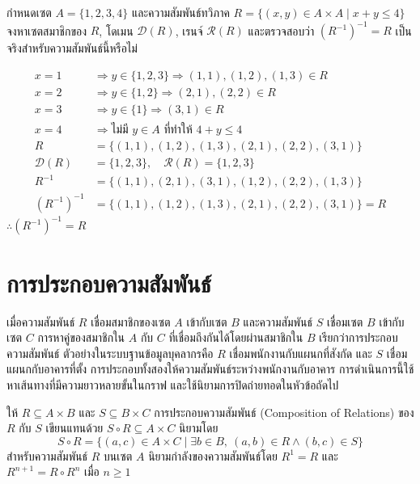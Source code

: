 \begin{ex}
\label{ex:domain-range-inequality}
กำหนดเซต $A = \{1, 2, 3, 4\}$ และความสัมพันธ์ทวิภาค $R = \{(x,y) \in A \times A \mid x + y \le 4\}$ จงหาเซตสมาชิกของ $R$, โดเมน $\mathcal{D}(R)$, เรนจ์ $\mathcal{R}(R)$ และตรวจสอบว่า $(R^{-1})^{-1} = R$ เป็นจริงสำหรับความสัมพันธ์นี้หรือไม่
\end{ex}
\begin{solution}
\begin{align*}
x = 1 &\Rightarrow y \in \{1,2,3\} \Rightarrow (1,1),(1,2),(1,3) \in R\\
x = 2 &\Rightarrow y \in \{1,2\} \Rightarrow (2,1),(2,2) \in R\\
x = 3 &\Rightarrow y \in \{1\} \Rightarrow (3,1) \in R\\
x = 4 &\Rightarrow \text{ไม่มี } y \in A \text{ ที่ทำให้ } 4+y \le 4\\
R &= \{(1,1),(1,2),(1,3),(2,1),(2,2),(3,1)\}\\
\mathcal{D}(R) &= \{1,2,3\}, \quad \mathcal{R}(R) = \{1,2,3\}\\
R^{-1} &= \{(1,1),(2,1),(3,1),(1,2),(2,2),(1,3)\}\\
(R^{-1})^{-1} &= \{(1,1),(1,2),(1,3),(2,1),(2,2),(3,1)\} = R
\end{align*}
$\therefore (R^{-1})^{-1} = R$ \solhere
\end{solution}



\section{การประกอบความสัมพันธ์}
\label{sec:relation-composition}
เมื่อความสัมพันธ์ $R$ เชื่อมสมาชิกของเซต $A$ เข้ากับเซต $B$ และความสัมพันธ์ $S$ เชื่อมเซต $B$ เข้ากับเซต $C$ การหาคู่ของสมาชิกใน $A$ กับ $C$ ที่เชื่อมถึงกันได้โดยผ่านสมาชิกใน $B$ เรียกว่าการประกอบความสัมพันธ์ ตัวอย่างในระบบฐานข้อมูลบุคลากรคือ $R$ เชื่อมพนักงานกับแผนกที่สังกัด และ $S$ เชื่อมแผนกกับอาคารที่ตั้ง การประกอบทั้งสองให้ความสัมพันธ์ระหว่างพนักงานกับอาคาร การดำเนินการนี้ใช้หาเส้นทางที่มีความยาวหลายขั้นในกราฟ และใช้นิยามการปิดถ่ายทอดในหัวข้อถัดไป~\parencite{johnsonbaugh2016discrete}

\begin{definition}[การประกอบความสัมพันธ์]
ให้ $R \subseteq A \times B$ และ $S \subseteq B \times C$ การประกอบความสัมพันธ์ (Composition of Relations) ของ $R$ กับ $S$ เขียนแทนด้วย $S \circ R \subseteq A \times C$ นิยามโดย
\[ S \circ R = \{(a,c) \in A \times C \mid \exists b \in B,\ (a,b) \in R \land (b,c) \in S\} \]
สำหรับความสัมพันธ์ $R$ บนเซต $A$ นิยามกำลังของความสัมพันธ์โดย $R^1 = R$ และ $R^{n+1} = R \circ R^n$ เมื่อ $n \ge 1$
\end{definition}

